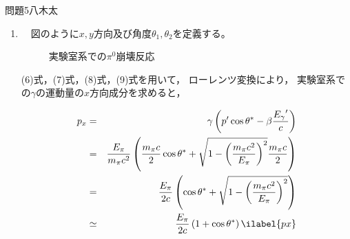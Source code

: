 \documentclass[fleqn]{jbook}
\def\ds{\displaystyle}
\newcommand{\no}{\nonumber \\}
\begin{document}
\begin{answer}{問題5}{八木太}
\begin{enumerate}
\begin{enumerate}
次に，$\gamma$線の
微小エネルギー幅$dE_{\gamma}$
に対応する断面積を$d\sigma$とおくと，
求めるスペクトルの縦軸にあたる量は$\ds \frac{d\sigma}{dE_{\gamma}}$であり，
次のようにして計算できる。
\begin{equation}
\frac{d\sigma}{dE_{\gamma}}
=\frac{d\sigma}{d\Omega}\frac{d\Omega}{d\theta^*}\frac{d\theta^*}{dE_{\gamma}}
\ilabel{計算方針}
\end{equation}
ただし，$d\Omega$は$\pi^0$静止系で見たときの微小立体角である。
%
まず，$\pi^0$静止系においては$\gamma$線の角分布は等方的であることから，
\begin{equation}
\frac{d\sigma}{d\Omega}=\mathrm{Const}
\ilabel{その1}
\end{equation}
である。
%
また，$\pi^0$静止系において，$\pi^0$の位置を中心とする半径1の球面のうち，
$\theta^*$〜$\theta^*+d\theta^*$に対応する部分の面積は
$2\pi\sin\theta^* d\theta^*$であるから，
\begin{equation}
\frac{d\Omega}{d\theta^*}\propto \sin\theta^*
\ilabel{その2}
\end{equation}
である。
%
そして，(10)式より，
\begin{equation}
\frac{d\theta^*}{dE_{\gamma}}
=\frac{1}{\ds \frac{dE_{\gamma}}{d\theta^*}}
\propto \frac{1}{\sin\theta^*}
\ilabel{その3}
\end{equation}
である。
従って，(12)式，(13)式，(14)式より，
\begin{equation}
\frac{d\sigma}{dE_{\gamma}}=\mathrm{Const}^\prime
\end{equation}
となり，$E_{\gamma}$の分布が一様であることが示された。\\
    
    \item 　図のように$x,y$方向及び角度$\theta_1,\theta_2$を定義する。
\begin{figure}[htbp]
    \centering
    
    \caption{実験室系での$\pi^0$崩壊反応}
\end{figure}
(6)式，(7)式，(8)式，(9)式を用いて，
ローレンツ変換により，
実験室系での$\gamma$の運動量の$x$方向成分を求めると，

\begin{eqnarray}
p_x 
&=& \gamma \left( p^\prime\cos\theta^* 
        - \beta \frac{{E_{\gamma}}^\prime}{c} \right) \no
&=& \frac{E_{\pi}}{m_{\pi}c^2} \left( \frac{m_{\pi}c}{2}\cos\theta^* 
        + \sqrt{1-\left(\frac{m_{\pi}c^2}{E_{\pi}}\right)^2}
         \frac{m_{\pi}c}{2} \right) \no
&=& \frac{E_{\pi}}{2c} \left( \cos\theta^* 
        + \sqrt{1-\left(\frac{m_{\pi}c^2}{E_{\pi}}\right)^2} \right) \no
&\simeq& \frac{E_{\pi}}{2c} \left( 1+\cos\theta^* \right) \ilabel{px}\\
& & \nonumber
\end{eqnarray}


\end{enumerate}
\end{enumerate}
\end{answer}
\end{document}
